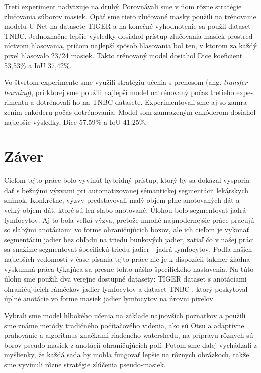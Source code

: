 \begin{otherlanguage}{slovak}
Tretí experiment nadväzuje na druhý. Porovnávali sme v ňom rôzne stratégie zlučovania súborov masiek. Opäť sme tieto zlučované masky použili na trénovanie modelu U-Net na datasete TIGER a na konečné vyhodnotenie sa použil dataset TNBC. Jednoznačne lepšie výsledky dosiahol prístup zlučovania masiek prostredníctvom hlasovania, pričom najlepší spôsob hlasovania bol ten, v ktorom za každý pixel hlasovalo 23/24 masiek. Takto trénovaný model dosiahol Dice koeficient 53,53\% a IoU 37,42\%.

Vo štvrtom experimente sme využili stratégiu učenia s prenosom (ang. \textit{transfer learning}), pri ktorej sme použili najlepší model natrénovaný počas tretieho experimentu a dotrénovali ho na TNBC datasete. Experimentovali sme aj so zamrazením enkóderu počas dotrénovania. Model som zamrazeným enkóderom dosiahol najlepšie výsledky, Dice 57.59\% a IoU 41.25\%.

\section{Záver}
Cieľom tejto práce bolo vyvinúť hybridný prístup, ktorý by sa dokázal vysporiadať s bežnými výzvami pri automatizovanej sémantickej segmentácii lekárskych snímok. Konkrétne, výzvy predstavovali malý objem plne anotovaných dát a veľký objem dát, ktoré sú len slabo anotované. Úlohou bolo segmentovať jadrá lymfocytov. Aj to bola veľká výzva, pretože mnohé najmodernejšie práce pracujú so slabými anotáciami vo forme ohraničujúcich boxov, ale ich cieľom je vykonať segmentáciu jadier bez ohľadu na triedu bunkových jadier, zatiaľ čo v našej práci sa snažíme segmentovať špecifickú triedu jadier - jadrá lymfocytov. Podľa našich najlepších vedomostí v čase písania tejto práce nie je k dispozícii takmer žiadna výskumná práca týkajúca sa presne tohto nášho špecifického nastavenia. Na túto úlohu sme použili dva verejne dostupné datasety: TIGER \cite{tiger_dataset} dataset s anotáciami ohraničujúcich rámčekov jadier lymfocytov a dataset TNBC \cite{TNBC-nuclei-seg-extended}, ktorý poskytoval úplné anotácie vo forme masiek jadier lymfocytov na úrovni pixelov. 

Vybrali sme model hlbokého učenia na základe najnovších poznatkov a použili sme známe metódy tradičného počítačového videnia, ako sú Otsu a adaptívne prahovanie a algoritmus značkami-riadeného watershedu, na prípravu rôznych súborov pseudo-masiek z anotácií ohraničujúcich polí. Potom sme ďalej vychádzali z myšlienky, že každá sada by mohla fungovať lepšie na rôznych obrázkoch, takže sme vyvinuli rôzne stratégie zlúčenia pseudo-masiek.


\end{otherlanguage}
